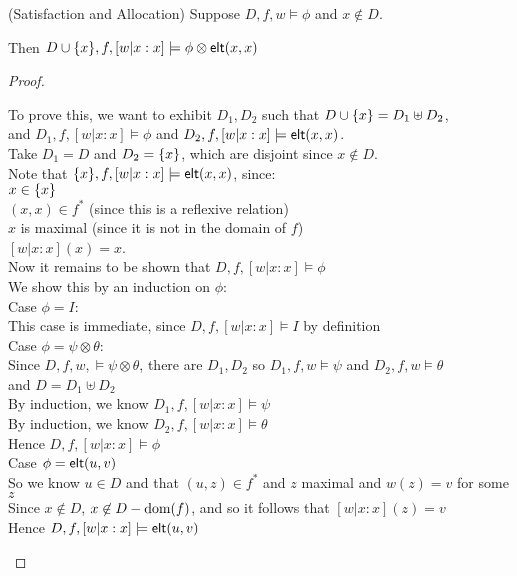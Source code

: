 \begin{lemma}{(Satisfaction and Allocation)}
Suppose $D, f, w \models \phi$ and $x \not \in D$. 

Then $D \cup \{{x}\}, f, [w|x:x] \models \phi \otimes \mathsf{elt}({x}, {x})$
\end{lemma}

\begin{proof}
\begin{tabbedproof}
\oo To prove this, we want to exhibit $D_1, D_2$ such that $D \cup \{{x}\} = D_1 \uplus D_2$, \\
\ox and $D_1, f, [w|x:x] \models \phi$ and $D_2, f, [w|x:x] \models \mathsf{elt}({x}, {x})$. \\ 
\oo Take $D_1 = D$ and $D_2 = \{{x}\}$, which are disjoint since $x \not\in D$. \\ 
\oo Note that $\{{x}\}, f, [w|x:x] \models \mathsf{elt}({x}, {x})$, since:  \\
\oox $x \in \{{x}\}$  \\
\oox $(x, x) \in f^*$ (since this is a reflexive relation) \\
\oox $x$ is maximal (since it is not in the domain of $f$) \\
\oox $[w|x:x](x) = x$. \\
\oo Now it remains to be shown that $D, f, [w|x:x] \models \phi$ \\
\oo We show this by an induction on $\phi$:  \\
\ooo Case $\phi = I$:\\ 
\oooo This case is immediate, since $D, f, [w|x:x] \models I$ by definition \\ 
\ooo Case $\phi = \psi \otimes \theta$: \\    
\oooo Since $D, f, w, \models \psi \otimes \theta$, there are $D_1, D_2$ so $D_1, f, w \models \psi$ and $D_2, f, w \models \theta$ \\
\ooox and $D = D_1 \uplus D_2$ \\
\oooo By induction, we know $D_1, f, [w|x:x] \models \psi$ \\ 
\oooo By induction, we know $D_2, f, [w|x:x] \models \theta$ \\
\oooo Hence $D, f, [w|x:x] \models \phi$ \\
\ooo Case $\phi = \mathsf{elt}({u}, {v})$ \\
\oooo So we know $u \in D$ and that $(u,z) \in f^{*}$ and $z$ maximal and $w(z) = v$ for some $z$ \\
\oooo Since $x \not \in D$, $x \not\in D - \mbox{dom}({f})$, and so it follows that $[w|x:x](z) = v$ \\
\oooo Hence $D, f, [w|x:x] \models \mathsf{elt}({u}, {v})$ 
\end{tabbedproof}
\end{proof}

